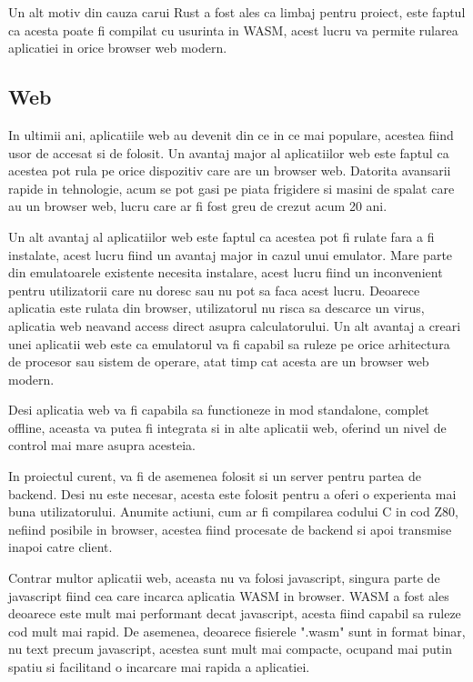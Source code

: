 \documentclass[titlepage,12pt]{article}
\begin{document}
Un alt motiv din cauza carui \ac {Rust} a fost ales ca limbaj pentru proiect, este faptul ca acesta poate fi compilat cu usurinta in \ac {WASM},
acest lucru va permite rularea aplicatiei in orice browser web modern.

\subsection{Web}

In ultimii ani, aplicatiile web au devenit din ce in ce mai populare, acestea fiind usor de accesat si de folosit.
Un avantaj major al aplicatiilor web este faptul ca acestea pot rula pe orice dispozitiv care are un browser web.
Datorita avansarii rapide in tehnologie, acum se pot gasi pe piata frigidere si masini de spalat care au un browser web, lucru care ar fi fost greu de crezut acum 20 ani.

Un alt avantaj al aplicatiilor web este faptul ca acestea pot fi rulate fara a fi instalate, acest lucru fiind un avantaj major in cazul unui emulator.
Mare parte din emulatoarele existente necesita instalare, acest lucru fiind un inconvenient pentru utilizatorii care nu doresc sau nu pot sa faca acest lucru.
Deoarece aplicatia este rulata din browser, utilizatorul nu risca sa descarce un virus, aplicatia web neavand access direct asupra calculatorului.
Un alt avantaj a creari unei aplicatii web este ca emulatorul va fi capabil sa ruleze pe orice arhitectura de procesor sau sistem de operare, atat timp cat acesta are un browser web modern.

Desi aplicatia web va fi capabila sa functioneze in mod standalone, complet offline, aceasta va putea fi integrata si in alte aplicatii web, oferind un nivel de control mai mare asupra acesteia.

In proiectul curent, va fi de asemenea folosit si un server pentru partea de backend. Desi nu este necesar, acesta este folosit pentru a oferi o experienta mai buna utilizatorului.
Anumite actiuni, cum ar fi compilarea codului C in cod Z80, nefiind posibile in browser, acestea fiind procesate de backend si apoi transmise inapoi catre client.

Contrar multor aplicatii web, aceasta nu va folosi javascript, singura parte de javascript fiind cea care incarca aplicatia \ac {WASM} in browser.
\ac {WASM} a fost ales deoarece este mult mai performant decat javascript, acesta fiind capabil sa ruleze cod mult mai rapid. De asemenea, deoarece fisierele ".wasm" sunt in format binar,
nu text precum javascript, acestea sunt mult mai compacte, ocupand mai putin spatiu si facilitand o incarcare mai rapida a aplicatiei.
\end{document}
